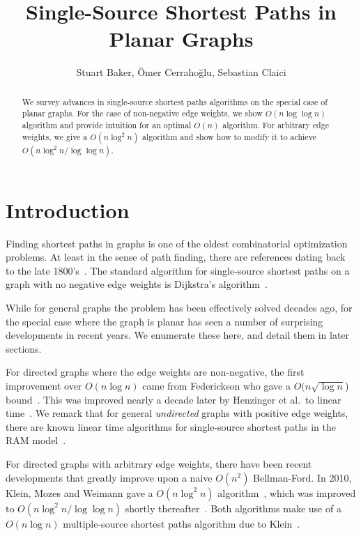 \documentclass[12pt]{article}
\title{Single-Source Shortest Paths in Planar Graphs}
\author{Stuart Baker, \"{O}mer Cerraho\u{g}lu, Sebastian Claici}
\date{}
\begin{document}
\maketitle

\begin{abstract}
  We survey advances in single-source shortest paths algorithms on the special case of planar graphs. For the case of non-negative edge weights, we show $O(n\log \log n)$ algorithm and provide intuition for an optimal $O(n)$ algorithm. For arbitrary edge weights, we give a $O(n\log^2 n)$ algorithm and show how to modify it to achieve $O(n\log^2 n/\log \log n)$.
\end{abstract}

\section{Introduction}
\label{sec:introduction}

Finding shortest paths in graphs is one of the oldest combinatorial optimization problems. At least in the sense of path finding, there are references dating back to the late 1800's~\cite{wiener1873ueber}. The standard algorithm for single-source shortest paths on a graph with no negative edge weights is Dijkstra's algorithm~\cite{dijkstra1959note}.

While for general graphs the problem has been effectively solved decades ago, for the special case where the graph is planar has seen a number of surprising developments in recent years. We enumerate these here, and detail them in later sections.

For directed graphs where the edge weights are non-negative, the first improvement over $O(n\log n)$ came from Federickson who gave a $O(n \sqrt{\log n}$) bound~\cite{federickson1987fast}. This was improved nearly a decade later by Henzinger et al.\ to linear time~\cite{henzinger1997faster}. We remark that for general \emph{undirected} graphs with positive edge weights, there are known linear time algorithms for single-source shortest paths in the RAM model~\cite{thorup1999undirected}.

For directed graphs with arbitrary edge weights, there have been recent developments that greatly improve upon a naive $O(n^2)$ Bellman-Ford. In 2010, Klein, Mozes and Weimann gave a $O(n \log^2 n)$ algorithm~\cite{klein2010shortest}, which was improved to $O(n \log^2 n / \log \log n)$ shortly thereafter~\cite{mozes2010shortest}. Both algorithms make use of a $O(n \log n)$ multiple-source shortest paths algorithm due to Klein~\cite{klein2005multiple}.
\end{document}
